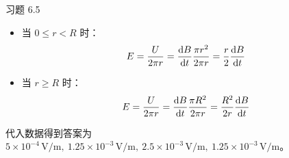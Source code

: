 \begin{problem}
	习题 6.5
	\begin{solution}
		\begin{itemize}
			\item 当 $0 \le r < R$ 时：
			$$
			E = \frac{U}{2 \pi r} = \dv{B}{t} \frac{\pi r^2}{2 \pi r} = \frac{r}{2} \dv{B}{t}
			$$
			\item 当 $r \ge R$ 时：
			$$
			E = \frac{U}{2 \pi r} = \dv{B}{t} \frac{\pi R^2}{2 \pi r} = \frac{R^2}{2 r} \dv{B}{t}
			$$
		\end{itemize}
		代入数据得到答案为 $5 \times 10^{-4} \,\mathrm{V / m},\ 1.25 \times 10^{-3}\,\mathrm{V / m},\ 2.5 \times 10^{-3} \,\mathrm{V / m},\ 1.25 \times 10^{-3}\,\mathrm{V / m}$。
	\end{solution}
\end{problem}